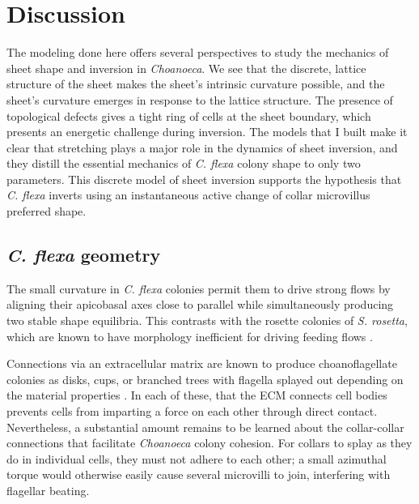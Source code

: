 
\chapter{Discussion} %

\ifpdf
    \graphicspath{{Chapter4/Figs/Raster/}{Chapter4/Figs/PDF/}{Chapter4/Figs/}}
\else
    \graphicspath{{Chapter4/Figs/Vector/}{Chapter4/Figs/}}
\fi

The modeling done here offers several perspectives to study the mechanics of sheet shape and inversion in \textit{Choanoeca}. 
We see that the discrete, lattice structure of the sheet makes the sheet's intrinsic curvature possible, and the sheet's curvature emerges in response to the lattice structure.
The presence of topological defects gives a tight ring of cells at the sheet boundary, which presents an energetic challenge during inversion.
The models that I built make it clear that stretching plays a major role in the dynamics of sheet inversion, and they distill the essential mechanics of \textit{C. flexa} colony shape to only two parameters.
This discrete model of sheet inversion supports the hypothesis that \textit{C. flexa} inverts using an instantaneous active change of collar microvillus preferred shape.

\section{\textit{C. flexa} geometry} 

The small curvature in \textit{C. flexa} colonies permit them to drive strong flows by aligning their apicobasal axes close to parallel while simultaneously producing two stable shape equilibria. 
This contrasts with the rosette colonies of \textit{S. rosetta}, which are known to have morphology inefficient for driving feeding flows \citep{kirkegaard2016}.

Connections via an extracellular matrix are known to produce choanoflagellate colonies as disks, cups, or branched trees with flagella splayed out depending on the material properties \citep{larson2020}.
In each of these, that the ECM connects cell bodies prevents cells from imparting a force on each other through direct contact.
Nevertheless, a substantial amount remains to be learned about the collar-collar connections that facilitate \textit{Choanoeca} colony cohesion.
For collars to splay as they do in individual cells, they must not adhere to each other; a small azimuthal torque would otherwise easily cause several microvilli to join, interfering with flagellar beating.

